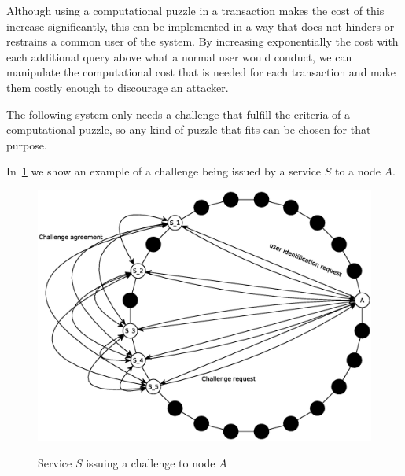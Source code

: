 
Although using a computational puzzle in a transaction makes the cost of this
increase significantly, this can be implemented in a way that does not hinders
or restrains a common user of the system.
By increasing exponentially the cost with each additional
query above what a normal user would conduct, we can manipulate the computational cost that is needed for each
transaction and make them costly enough to discourage an attacker.





 The following system only needs a challenge that fulfill the
criteria of a computational puzzle, so any kind of puzzle that fits can be chosen for
that purpose.

In~\ref{fig:challenge} we show an example of a challenge being issued by a
service $S$ to a node $A$.

\begin{figure}[!htb]
\centering
\includegraphics[width=14cm]{../img/challenge}\\
\caption{Service $S$ issuing a  challenge to node $A$}
\label{fig:challenge}
\end{figure}

